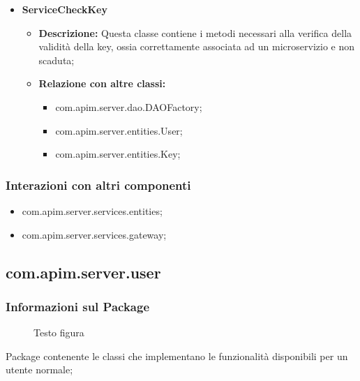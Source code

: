 {{{\begin{itemize}
\begin{itemize}
\begin{itemize}
            \item com.apim.server.entities.API;
            \item com.apim.server.entities.Key;
            \end{itemize}
          \end{itemize}
          \item \textbf{ServiceCheckKey}
            \begin{itemize}
              \item \textbf{Descrizione:} Questa classe contiene i metodi necessari alla verifica della validità della key, ossia correttamente associata ad un microservizio e non scaduta;
              \item \textbf{Relazione con altre classi:}
              \begin{itemize}
              \item com.apim.server.dao.DAOFactory;
              \item com.apim.server.entities.User;
              \item com.apim.server.entities.Key;
              \end{itemize}
            \end{itemize}
          \end{itemize}
          \subsubsection{Interazioni con altri componenti}
          \begin{itemize}
          \item com.apim.server.services.entities;
          \item com.apim.server.services.gateway;
          \end{itemize}
  }
    \subsection{com.apim.server.user}{
    \subsubsection{Informazioni sul Package}
        \begin{figure}[ht]
          \centering
          \caption{Testo figura}
          \label{Testo figura}
        \end{figure}
        Package  contenente le classi che implementano le funzionalità disponibili per un utente normale;
}}}
